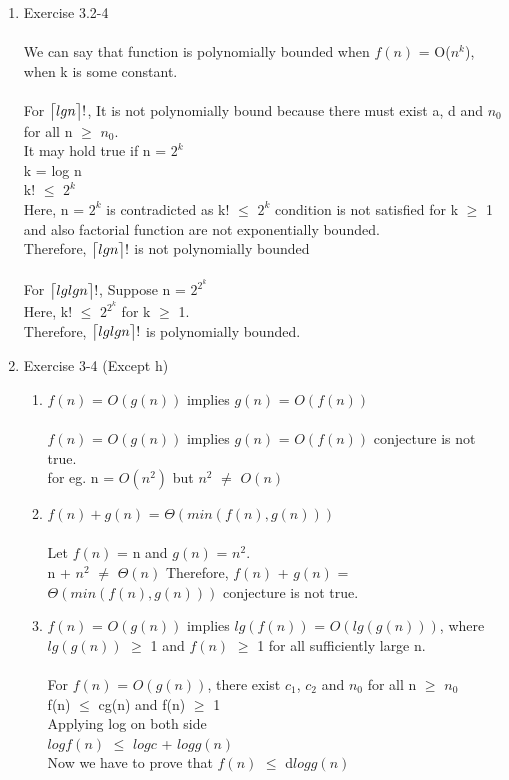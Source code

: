 \documentclass{article}
\DeclarePairedDelimiter{\ceil}{\lceil}{\rceil}
\begin{document}
\begin{enumerate}
    \item Exercise 3.2-4\\\\
    We can say that function is polynomially bounded when $f(n)$ = O($n^k$), when k is some constant.\\\\
    For $\ceil[\big]{lg n}!$, It is not polynomially bound because there must exist  a, d and $n_0$ for all n $\geq$ $n_0$. \\
    It may hold true if n  = $2^k$\\  
    k = log n\\
    k! $\leq$ $2^k$\\
    Here, n = $2^k$  is contradicted as k! $\leq$ $2^k$ condition is not satisfied for k $\geq$ 1 and also factorial function are not exponentially bounded. \\
    Therefore, $\ceil[\big]{lg n}!$ is not polynomially bounded\\\\  
    For $\ceil[\big]{lg lg n}!$, Suppose n  = $2^{2^k}$ \\
    Here, k! $\leq$ $2^{2^k}$  for k $\geq$ 1.\\
    Therefore, $\ceil[\big]{lg lg n}!$ is polynomially bounded.\\
    \item Exercise 3-4 (Except h)\\
    \begin{enumerate}
    \item $f(n)$ = $O(g(n))$ implies $g(n)$ = $O(f(n))$\\\\
    $f(n)$ = $O(g(n))$ implies $g(n)$ = $O(f(n))$ conjecture is not true.\\
    for eg. n = $O(n^2)$ but $n^2$ $\neq$ $O(n)$ \\
    \item $f(n) + g(n)$ = $\Theta(min(f(n),g(n)))$ \\\\
    
    Let $f(n)$ = n and $g(n)$ = $n^2$.\\
    n + $n^2$ $\neq$ $\Theta(n)$
    Therefore, $f(n)$ + $g(n)$ = $\Theta(min(f(n),g(n)))$ conjecture is not true.   \\ 
    \item $f(n)$ = $O(g(n))$ implies $lg(f(n))$ =  $O(lg(g(n)))$, where $lg(g(n))$ $\geq$ 1 and  $f(n)$ $\geq$ 1 for all sufficiently large n.\\\\
    For $f(n)$ = $O(g(n))$, there exist $c_1$, $c_2$ and $n_0$ for all n $\geq$ $n_0$\\
    f(n) $\leq$ cg(n) and f(n) $\geq$ 1\\
    Applying log on both side\\
    $log f(n)$ $\leq$ $log c$ + $log g(n)$ \\
    Now we have to prove that $f(n)$ $\leq$ d$log g(n)$\\
    

\end{enumerate}
\end{enumerate}
\end{document}
